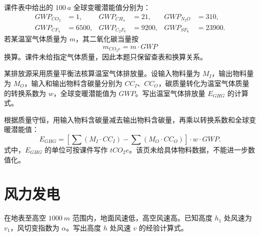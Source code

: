 \begin{solution}
课件表中给出的 \(\qty{100}{a}\) 全球变暖潜能值分别为：
\begin{equation*}
\begin{aligned}
GWP_{CO_2} &= 1, &
GWP_{CH_4} &= 21, &
GWP_{N_2O} &= 310,\\
GWP_{CF_4} &= 6500, &
GWP_{C_2F_6} &= 9200, &
GWP_{SF_6} &= 23900.
\end{aligned}
\end{equation*}
若某温室气体质量为 \(m\)，其二氧化碳当量按
\begin{equation}
m_{CO_2e} = m \cdot GWP
\end{equation}
换算。课件未给指定气体质量，因此本题只保留查表和换算关系。
\end{solution}

\begin{problem}[质量平衡法碳核算]\label{exer:calc_01_intro_p108_01}
某排放源采用质量平衡法核算温室气体排放量。设输入物料量为 \(M_I\)，输出物料量为 \(M_O\)，输入和输出物料含碳量分别为 \(CC_I\)、\(CC_O\)，碳质量转化为温室气体质量的转换系数为 \(w\)，全球变暖潜能值为 \(GWP\)。写出温室气体排放量 \(E_{GHG}\) 的计算式。
\end{problem}

\begin{solution}
根据质量守恒，用输入物料含碳量减去输出物料含碳量，再乘以转换系数和全球变暖潜能值：
\begin{equation}
E_{GHG}
= \left[\sum(M_I \cdot CC_I) - \sum(M_O \cdot CC_O)\right]\cdot w \cdot GWP.
\end{equation}
式中，\(E_{GHG}\) 的单位可按课件写作 \(\unit{tCO_2e}\)。该页未给具体物料数据，不能进一步数值化。
\end{solution}

\section{风力发电}

\begin{problem}[风速随高度变化]\label{exer:calc_03_wind_p024_01}
在地表至高空 \(\qty{1000}{m}\) 范围内，地面风速低，高空风速高。已知高度 \(h_1\) 处风速为 \(v_1\)，风切变指数为 \(\alpha\)。写出高度 \(h\) 处风速 \(v\) 的经验计算式。
\end{problem}

